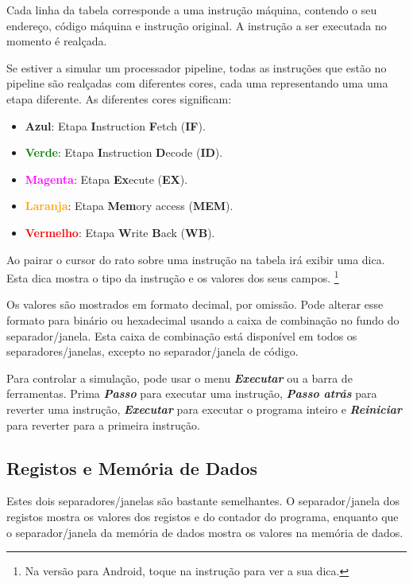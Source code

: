 \documentclass[11pt,a4paper,twoside,titlepage]{article}
\newcommand{\menupath}[1]{\textbf{\emph{#1}}}
\begin{document}
Cada linha da tabela corresponde a uma instrução máquina, contendo o seu
endereço, código máquina e instrução original.
A instrução a ser executada no momento é realçada.

Se estiver a simular um processador pipeline, todas as instruções que estão no
pipeline são realçadas com diferentes cores, cada uma representando uma uma etapa
diferente.
As diferentes cores significam:
\begin{itemize}
	\item \textbf{\textcolor{cyan2}{Azul}}: Etapa \textbf{I}nstruction 
		\textbf{F}etch (\textbf{IF}).
	\item \textbf{\textcolor{green}{Verde}}: Etapa \textbf{I}nstruction 
		\textbf{D}ecode (\textbf{ID}).
	\item \textbf{\textcolor{magenta}{Magenta}}: Etapa \textbf{Ex}ecute 
		(\textbf{EX}).
	\item \textbf{\textcolor{orange}{Laranja}}: Etapa \textbf{Mem}ory access
		(\textbf{MEM}).
	\item \textbf{\textcolor{red}{Vermelho}}: Etapa \textbf{W}rite \textbf{B}ack 
		(\textbf{WB}).
\end{itemize}

Ao pairar o cursor do rato sobre uma instrução na tabela irá exibir uma dica.
Esta dica mostra o tipo da instrução e os valores dos seus campos. \footnote{Na
versão para Android, toque na instrução para ver a sua dica.}

Os valores são mostrados em formato decimal, por omissão.
Pode alterar esse formato para binário ou hexadecimal usando a caixa de 
combinação no fundo do separador/janela.
Esta caixa de combinação está disponível em todos os separadores/janelas, 
excepto no separador/janela de código.

Para controlar a simulação, pode usar o menu \menupath{Executar} ou a barra de
ferramentas. Prima \menupath{Passo} para executar uma instrução, 
\menupath{Passo atrás} para reverter uma instrução, \menupath{Executar} para
executar o programa inteiro e \menupath{Reiniciar} para reverter para a primeira
instrução.


\subsection{Registos e Memória de Dados}

Estes dois separadores/janelas são bastante semelhantes.
O separador/janela dos registos mostra os valores dos registos e do contador do
programa, enquanto que o separador/janela da memória de dados mostra os valores
na memória de dados.
\end{document}
